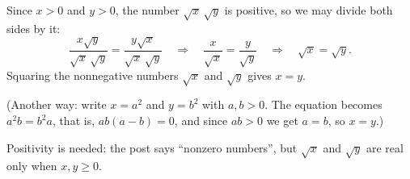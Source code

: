 Since $x>0$ and $y>0$, the number $\sqrt x\,\sqrt y$ is positive, so we may divide both sides by it:
\[\dfrac{x\sqrt y}{\sqrt x\,\sqrt y}=\dfrac{y\sqrt x}{\sqrt x\,\sqrt y}\quad\Longrightarrow\quad\dfrac{x}{\sqrt x}=\dfrac{y}{\sqrt y}\quad\Longrightarrow\quad\sqrt x=\sqrt y .\]
Squaring the nonnegative numbers $\sqrt x$ and $\sqrt y$ gives $\boxed{x=y}$.

(Another way: write $x=a^2$ and $y=b^2$ with $a,b>0$. The equation becomes $a^2b=b^2a$, that is, $ab(a-b)=0$, and since $ab>0$ we get $a=b$, so $x=y$.)

Positivity is needed: the post says ``nonzero numbers'', but $\sqrt x$ and $\sqrt y$ are real only when $x,y\ge0$.

